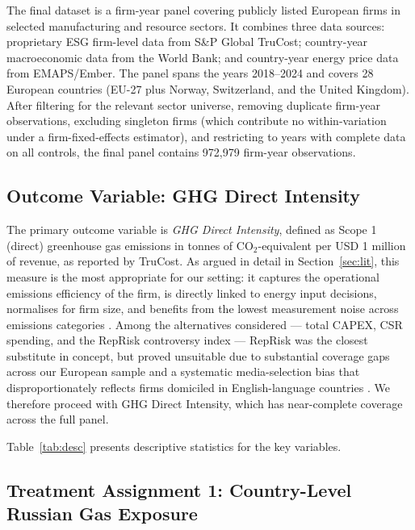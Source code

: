 \documentclass[12pt,a4paper]{article}
\begin{document}
The final dataset is a firm-year panel covering publicly listed European firms in selected manufacturing and resource sectors. It combines three data sources: proprietary ESG firm-level data from S\&P Global TruCost; country-year macroeconomic data from the World Bank; and country-year energy price data from EMAPS/Ember. The panel spans the years 2018--2024 and covers 28 European countries (EU-27 plus Norway, Switzerland, and the United Kingdom). After filtering for the relevant sector universe, removing duplicate firm-year observations, excluding singleton firms (which contribute no within-variation under a firm-fixed-effects estimator), and restricting to years with complete data on all controls, the final panel contains 972,979 firm-year observations.

\subsection{Outcome Variable: GHG Direct Intensity}

The primary outcome variable is \textit{GHG Direct Intensity}, defined as Scope 1 (direct) greenhouse gas emissions in tonnes of CO$_2$-equivalent per USD 1 million of revenue, as reported by TruCost. As argued in detail in Section~\ref{sec:lit}, this measure is the most appropriate for our setting: it captures the operational emissions efficiency of the firm, is directly linked to energy input decisions, normalises for firm size, and benefits from the lowest measurement noise across emissions categories \citep{ngfs2024ghg}. Among the alternatives considered — total CAPEX, CSR spending, and the RepRisk controversy index — RepRisk was the closest substitute in concept, but proved unsuitable due to substantial coverage gaps across our European sample and a systematic media-selection bias that disproportionately reflects firms domiciled in English-language countries \citep{barkemeyer2023}. We therefore proceed with GHG Direct Intensity, which has near-complete coverage across the full panel.

Table~\ref{tab:desc} presents descriptive statistics for the key variables.

\begin{table}[H]
    \centering
    \caption{Descriptive Statistics}
    \label{tab:desc}
    \resizebox{\textwidth}{!}{%
        
    }
\end{table}

\subsection{Treatment Assignment 1: Country-Level Russian Gas Exposure}
\end{document}
